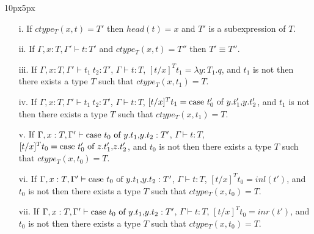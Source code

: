 \begin{lemma}
  \label{lemma:ctype_props_ssfp}
  \vspace{-30px}
  \begin{changemargin}{10px}{5px}\noindent
  \begin{itemize}
  \item[i.] If $ctype_T(x,t) = T'$ then $head(t) = x$ and $T'$ 
    is a subexpression of $T$.
    
  \item[ii.] If $\Gamma,x:T,\Gamma' \vdash t:T'$ and $ctype_T(x,t) = T''$ then
    $T' \equiv T''$.

  \item[iii.] If $\Gamma,x:T,\Gamma' \vdash t_1\ t_2:T'$, $\Gamma \vdash t:T$,
    $[t/x]^T t_1 = \lambda y:T_1.q$, and $t_1$ is not then there exists a type
    $T$ such that $ctype_T(x,t_1) = T$.

  \item[iv.] If $\Gamma,x:T,\Gamma' \vdash t_1\ t_2:T'$, $\Gamma \vdash t:T$,
    $[t/x]^T t_1 = \mbox{case}\ t'_0\ \text{of}\ y\text{.}t'_1\text{,}y\text{.}t'_2$, and $t_1$ is not then there exists a type
    $T$ such that $ctype_T(x,t_1) = T$.

  \item[v.] If $\Gamma,x:T,\Gamma' \vdash \mbox{case}\ t_0\ \text{of}\ y\text{.}t_1\text{,}y\text{.}t_2:T'$, 
    $\Gamma \vdash t:T$, $[t/x]^T t_0 = \mbox{case}\ t'_0\ \text{of}\ z\text{.}t'_1\text{,}z\text{.}t'_2$, and 
    $t_0$ is not then there exists a type $T$ such that $ctype_T(x,t_0) = T$.

  \item[vi.] If $\Gamma,x:T,\Gamma' \vdash \mbox{case}\ t_0\ \text{of}\ y\text{.}t_1\text{,}y\text{.}t_2:T'$, 
    $\Gamma \vdash t:T$, $[t/x]^T t_0 = inl(t')$, and $t_0$ is not then there 
    exists a type $T$ such that $ctype_T(x,t_0) = T$.

  \item[vii.] If $\Gamma,x:T,\Gamma' \vdash \mbox{case}\ t_0\ \text{of}\ y\text{.}t_1\text{,}y\text{.}t_2:T'$, 
    $\Gamma \vdash t:T$, $[t/x]^T t_0 = inr(t')$, and $t_0$ is not then 
    there exists a type $T$ such that $ctype_T(x,t_0) = T$.
  \end{itemize}
  \end{changemargin}
\end{lemma}

